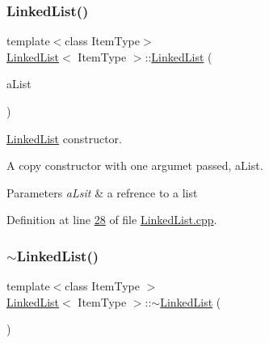 \mbox{\label{classLinkedList_a6f1443c6120352f1f5b6bd3c0d95e41e}} 
\subsubsection{\texorpdfstring{Linked\+List()}{LinkedList()}\hspace{0.1cm}{\footnotesize\ttfamily [2/2]}}
{\footnotesize\ttfamily template$<$class Item\+Type$>$ \\
\hyperlink{classLinkedList}{Linked\+List}$<$ Item\+Type $>$\+::\hyperlink{classLinkedList}{Linked\+List} (\begin{DoxyParamCaption}\item[{const \hyperlink{classLinkedList}{Linked\+List}$<$ Item\+Type $>$ \&}]{a\+List }\end{DoxyParamCaption})}



\hyperlink{classLinkedList}{Linked\+List} constructor. 

A copy constructor with one argumet passed, a\+List. 
\begin{DoxyParams}{Parameters}
{\em a\+Lsit} & a refrence to a list \\
\hline
\end{DoxyParams}


Definition at line \hyperlink{LinkedList_8cpp_source_l00028}{28} of file \hyperlink{LinkedList_8cpp_source}{Linked\+List.\+cpp}.

\mbox{\label{classLinkedList_a66aee17d756fe0e002375897383c180b}} 
\subsubsection{\texorpdfstring{$\sim$\+Linked\+List()}{~LinkedList()}}
{\footnotesize\ttfamily template$<$class Item\+Type $>$ \\
\hyperlink{classLinkedList}{Linked\+List}$<$ Item\+Type $>$\+::$\sim$\hyperlink{classLinkedList}{Linked\+List} (\begin{DoxyParamCaption}{ }\end{DoxyParamCaption})\hspace{0.3cm}{\ttfamily [virtual]}}



